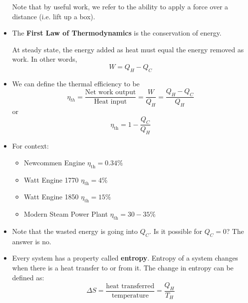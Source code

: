 \begin{itemize}
\begin{center}
    \end{center}
    Note that by useful work, we refer to the ability to apply a force over a distance (i.e. lift up a box).
    \item The \textbf{First Law of Thermodynamics} is the conservation of energy.
    \begin{idea}
        At steady state, the energy added as heat must equal the energy removed as work. In other words, 
        \begin{equation}
            W = Q_H - Q_C
        \end{equation}
    \end{idea}
    \item We can define the thermal efficiency to be
    \begin{equation}
        \eta_{th} = \frac{\text{Net work output}}{\text{Heat input}} = \frac{W}{Q_H} = \frac{Q_H-Q_C}{Q_H}
    \end{equation}
    or
    \begin{equation}
        \eta_\text{th} = 1 - \frac{Q_C}{Q_H}
    \end{equation}
    \item For context:
    \begin{itemize}
        \item Newcommen Engine $\eta_\text{th} =0.34\%$
        \item Watt Engine 1770 $\eta_\text{th} = 4\%$
        \item Watt Engine 1850 $\eta_\text{th} = 15\%$
        \item Modern Steam Power Plant $\eta_\text{th}=30-35\%$
    \end{itemize}
    \item Note that the wasted energy is going into $Q_C$. Is it possible for $Q_C=0$? The answer is no.
    \item Every system has a property called \textbf{entropy}. Entropy of a system changes when there is a heat transfer to or from it. The change in entropy can be defined as:
    \begin{equation}
        \Delta S = \frac{\text{heat transferred}}{\text{temperature}} = \frac{Q_H}{T_H}
    \end{equation}

\end{itemize}
